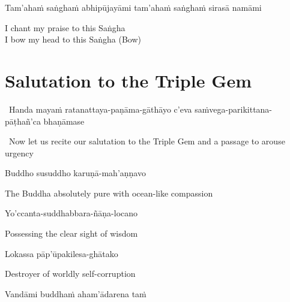 \suttaRef{[SN 12.41]}

\begin{pali-hang}
  Tam'ahaṁ saṅghaṁ abhipūjayāmi tam'ahaṁ saṅghaṁ sirasā namāmi
\end{pali-hang}

\begin{english}
  I chant my praise to this Saṅgha\\
  I bow my head to this Saṅgha \hfill{\textnormal{\ifafiveversion\fontsize{12.5}{18}\fi\ifasixversion\fontsize{9}{13}\fi\selectfont (Bow)}}
\end{english}



\section{Salutation to the Triple Gem}
\label{salutation}

\begin{leader}
  \anglebracketleft\ \hspace{-0.5mm}Handa mayaṁ ratanattaya-paṇāma-gāthāyo c'eva saṁvega-parikittana-pāṭhañ'ca bhaṇāmase \hspace{-0.5mm}\anglebracketright\
\end{leader}
\begin{leader-english-belowpali}
  \anglebracketleft\ \hspace{-0.5mm}Now let us recite our salutation to the Triple Gem and a passage to arouse urgency \hspace{-0.5mm}\anglebracketright\
\end{leader-english-belowpali}

Buddho susuddho karuṇā-mah'aṇṇavo

\begin{english}
  The Buddha absolutely pure with ocean-like compassion
\end{english}

Yo'ccanta-suddhabbara-ñāṇa-locano

\begin{english}
  Possessing the clear sight of wisdom
\end{english}

Lokassa pāp'ūpakilesa-ghātako

\begin{english}
  Destroyer of worldly self-corruption
\end{english}

Vandāmi buddhaṁ aham'ādarena taṁ

